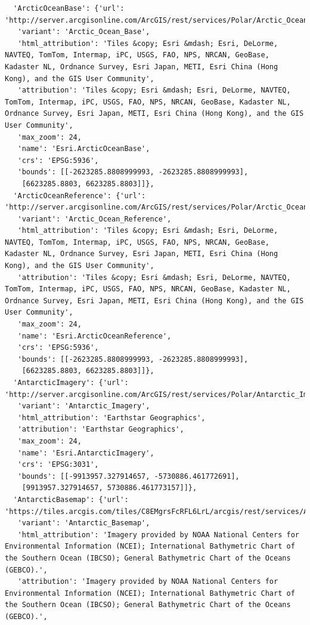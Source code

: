 \documentclass[
  letterpaper,
  DIV=11,
  numbers=noendperiod]{scrreprt}
\begin{document}
\begin{verbatim}
  'ArcticOceanBase': {'url': 'http://server.arcgisonline.com/ArcGIS/rest/services/Polar/Arctic_Ocean_Base/MapServer/tile/{z}/{y}/{x}',
   'variant': 'Arctic_Ocean_Base',
   'html_attribution': 'Tiles &copy; Esri &mdash; Esri, DeLorme, NAVTEQ, TomTom, Intermap, iPC, USGS, FAO, NPS, NRCAN, GeoBase, Kadaster NL, Ordnance Survey, Esri Japan, METI, Esri China (Hong Kong), and the GIS User Community',
   'attribution': 'Tiles &copy; Esri &mdash; Esri, DeLorme, NAVTEQ, TomTom, Intermap, iPC, USGS, FAO, NPS, NRCAN, GeoBase, Kadaster NL, Ordnance Survey, Esri Japan, METI, Esri China (Hong Kong), and the GIS User Community',
   'max_zoom': 24,
   'name': 'Esri.ArcticOceanBase',
   'crs': 'EPSG:5936',
   'bounds': [[-2623285.8808999993, -2623285.8808999993],
    [6623285.8803, 6623285.8803]]},
  'ArcticOceanReference': {'url': 'http://server.arcgisonline.com/ArcGIS/rest/services/Polar/Arctic_Ocean_Reference/MapServer/tile/{z}/{y}/{x}',
   'variant': 'Arctic_Ocean_Reference',
   'html_attribution': 'Tiles &copy; Esri &mdash; Esri, DeLorme, NAVTEQ, TomTom, Intermap, iPC, USGS, FAO, NPS, NRCAN, GeoBase, Kadaster NL, Ordnance Survey, Esri Japan, METI, Esri China (Hong Kong), and the GIS User Community',
   'attribution': 'Tiles &copy; Esri &mdash; Esri, DeLorme, NAVTEQ, TomTom, Intermap, iPC, USGS, FAO, NPS, NRCAN, GeoBase, Kadaster NL, Ordnance Survey, Esri Japan, METI, Esri China (Hong Kong), and the GIS User Community',
   'max_zoom': 24,
   'name': 'Esri.ArcticOceanReference',
   'crs': 'EPSG:5936',
   'bounds': [[-2623285.8808999993, -2623285.8808999993],
    [6623285.8803, 6623285.8803]]},
  'AntarcticImagery': {'url': 'http://server.arcgisonline.com/ArcGIS/rest/services/Polar/Antarctic_Imagery/MapServer/tile/{z}/{y}/{x}',
   'variant': 'Antarctic_Imagery',
   'html_attribution': 'Earthstar Geographics',
   'attribution': 'Earthstar Geographics',
   'max_zoom': 24,
   'name': 'Esri.AntarcticImagery',
   'crs': 'EPSG:3031',
   'bounds': [[-9913957.327914657, -5730886.461772691],
    [9913957.327914657, 5730886.461773157]]},
  'AntarcticBasemap': {'url': 'https://tiles.arcgis.com/tiles/C8EMgrsFcRFL6LrL/arcgis/rest/services/Antarctic_Basemap/MapServer/tile/{z}/{y}/{x}',
   'variant': 'Antarctic_Basemap',
   'html_attribution': 'Imagery provided by NOAA National Centers for Environmental Information (NCEI); International Bathymetric Chart of the Southern Ocean (IBCSO); General Bathymetric Chart of the Oceans (GEBCO).',
   'attribution': 'Imagery provided by NOAA National Centers for Environmental Information (NCEI); International Bathymetric Chart of the Southern Ocean (IBCSO); General Bathymetric Chart of the Oceans (GEBCO).',

\end{verbatim}
\end{document}
